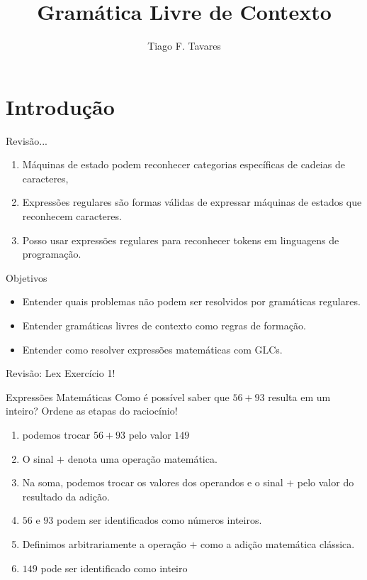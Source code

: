 \documentclass{beamer}
\title[06-Gramática Livre de Contexto]{Gramática Livre de Contexto}
\author{Tiago F. Tavares}
\institute{FEEC -- UNICAMP}
\date{}
\begin{document}
\begin{frame}
  \titlepage
\end{frame}


\section{Introdução}

\begin{frame}{Revisão...}
  \Large
  \begin{enumerate}
  \item Máquinas de estado podem reconhecer categorias específicas de cadeias de
    caracteres,
  \item Expressões regulares são formas válidas de expressar máquinas de estados
    que reconhecem caracteres.
  \item Posso usar expressões regulares para reconhecer tokens em linguagens de
    programação.
  \end{enumerate}
\end{frame}


\begin{frame}{Objetivos}
  \Large
  \begin{itemize}
    \item Entender quais problemas não podem ser resolvidos por gramáticas
       regulares.
    \item Entender gramáticas livres de contexto como regras de formação.
    \item Entender como resolver expressões matemáticas com GLCs.
  \end{itemize}
\end{frame}


\begin{frame}{Revisão: Lex}
  \Large
  Exercício 1!
\end{frame}


\begin{frame}{Expressões Matemáticas}
\large
  Como é possível saber que $56 + 93$ resulta em um inteiro? Ordene as etapas do
  raciocínio!
  \begin{enumerate}
    \item podemos trocar $56 + 93$ pelo valor $149$
    \item O sinal $+$ denota uma operação matemática.
    \item Na soma, podemos trocar os valores dos operandos e o sinal $+$ pelo
      valor do resultado da adição.
    \item $56$ e $93$ podem ser identificados como números inteiros.
    \item Definimos arbitrariamente a operação $+$ como a adição matemática
      clássica.
    \item $149$ pode ser identificado como inteiro
  \end{enumerate}
\end{frame}
\end{document}
